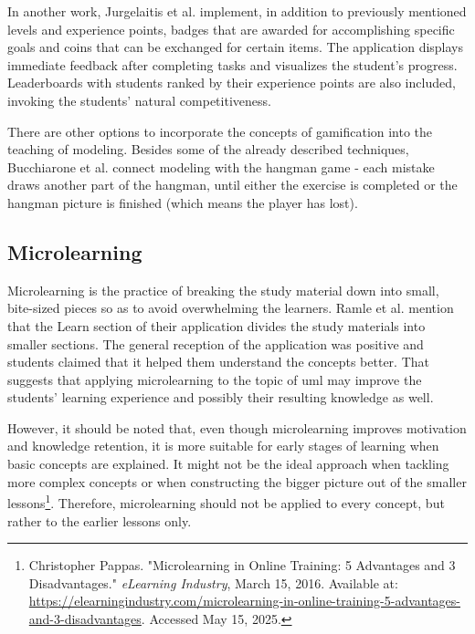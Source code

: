 In another work, Jurgelaitis et al.\cite{jurgelaitis2019implementing} implement, in addition to previously mentioned levels and experience points, badges that are awarded for accomplishing specific goals and coins that can be exchanged for certain items. The application displays immediate feedback after completing tasks and visualizes the student's progress. Leaderboards with students ranked by their experience points are also included, invoking the students' natural competitiveness.

There are other options to incorporate the concepts of gamification into the teaching of modeling. Besides some of the already described techniques, Bucchiarone et al.\cite{BUCCHIARONE2023102974} connect modeling with the hangman game - each mistake draws another part of the hangman, until either the exercise is completed or the hangman picture is finished (which means the player has lost).



\subsection{Microlearning}


Microlearning is the practice of breaking the study material down into small, bite-sized pieces so as to avoid overwhelming the learners. Ramle et al.\cite{ramle2021uml} mention that the Learn section of their application divides the study materials into smaller sections. The general reception of the application was positive and students claimed that it helped them understand the concepts better. That suggests that applying microlearning to the topic of \ac{uml} may improve the students' learning experience and possibly their resulting knowledge as well.

However, it should be noted that, even though microlearning improves motivation and knowledge retention, it is more suitable for early stages of learning when basic concepts are explained. It might not be the ideal approach when tackling more complex concepts or when constructing the bigger picture out of the smaller lessons\footnote{Christopher Pappas. "Microlearning in Online Training: 5 Advantages and 3 Disadvantages." \textit{eLearning Industry}, March 15, 2016. Available at: \url{https://elearningindustry.com/microlearning-in-online-training-5-advantages-and-3-disadvantages}. Accessed May 15, 2025.}. Therefore, microlearning should not be applied to every concept, but rather to the earlier lessons only.

